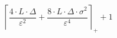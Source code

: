 \[\left\lceil \frac{4 \cdot L \cdot \Delta}{\varepsilon^{2}} + \frac{8 \cdot L \cdot \Delta \cdot \sigma^{2}}{\varepsilon^{4}} \right\rceil_{+} + 1\]

